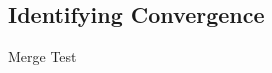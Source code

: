 \documentclass[12pt]{article}
\begin{document}


{\color{red}
%
%
\subsection{Identifying Convergence}
%
%
Merge Test
}
\end{document}
